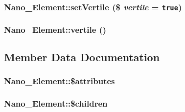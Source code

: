 \hypertarget{classNano__Element_0249d33d64a9fd3945973948c6e06e67}{
\subsubsection[{setVertile}]{\setlength{\rightskip}{0pt plus 5cm}Nano\_\-Element::setVertile (\$ {\em vertile} = {\tt true})}}
\label{classNano__Element_0249d33d64a9fd3945973948c6e06e67}


\hypertarget{classNano__Element_95bdea0f50dd6b8d7c342a4bf49e2d65}{
\subsubsection[{vertile}]{\setlength{\rightskip}{0pt plus 5cm}Nano\_\-Element::vertile ()}}
\label{classNano__Element_95bdea0f50dd6b8d7c342a4bf49e2d65}




\subsection{Member Data Documentation}
\hypertarget{classNano__Element_ceb605c508e41975e8b34777db94bf91}{
\subsubsection[{\$attributes}]{\setlength{\rightskip}{0pt plus 5cm}Nano\_\-Element::\$attributes}}
\label{classNano__Element_ceb605c508e41975e8b34777db94bf91}


\hypertarget{classNano__Element_8be530ddca7d1d287f1ab65ee4503ee6}{
\subsubsection[{\$children}]{\setlength{\rightskip}{0pt plus 5cm}Nano\_\-Element::\$children}}
\label{classNano__Element_8be530ddca7d1d287f1ab65ee4503ee6}


